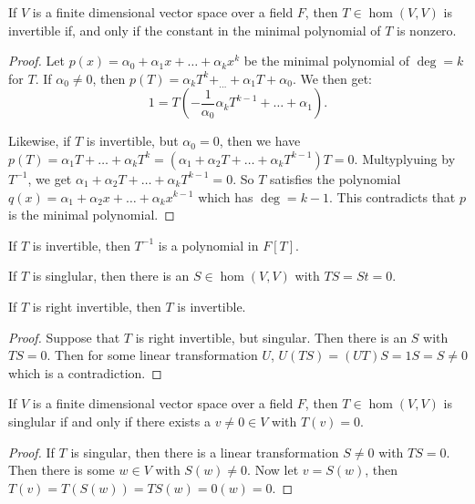 \begin{theorem}\label{3.1.5}
    If $V$ is a finite dimensional vector space over a field  $F$, then  $T \in
    \hom{(V,V)}$ is invertible if, and only if the constant in the minimal
    polynomial of  $T$ is nonzero.
\end{theorem}
\begin{proof}
    Let $p(x)=\alpha_0+\alpha_1x+\dots+\alpha_kx^k$ be the minimal polynomial of
    $\deg = k$ for  $T$. If $\alpha_0 \neq 0$, then
    $p(T)=\alpha_kT^k+_\dots+\alpha_1T+\alpha_0$. We then get:
        \begin{equation*}
            1 = T(-\frac{1}{\alpha_0}\alpha_kT^{k-1}+\dots+\alpha_1).
        \end{equation*}

        Likewise, if $T$ is invertible, but  $\alpha_0 = 0$, then we have
        $p(T)=\alpha_1T+\dots+\alpha_kT^k=(\alpha_1+\alpha_2T+\dots+\alpha_kT^{k-1})T
        =0$. Multyplyuing by $T^{-1}$, we get $\alpha_1+\alpha_2T+\dots+
        \alpha_kT^{k-1}=0$. So $T$ satisfies the polynomial
        $q(x)=\alpha_1+\alpha_2x+\dots+\alpha_kx^{k-1}$ which has $\deg = k-1$.
        This contradicts that  $p$ is the minimal polynomial.
\end{proof}
\begin{corollary}
    If $T$ is invertible, then  $T^{-1}$ is a polynomial in $F[T]$.
\end{corollary}
\begin{corollary}
    If $T$ is singlular, then there is an  $S \in \hom{(V,V)}$ with $TS=St=0$.
\end{corollary}
\begin{corollary}
    If $T$ is right invertible, then  $T$ is invertible.
\end{corollary}
\begin{proof}
    Suppose that $T$ is right invertible, but singular. Then there is an  $S$
    with  $TS=0$. Then for some linear transformation  $U$,  $U(TS)=(UT)S=1S=S
    \neq 0$ which is a contradiction.
\end{proof}

\begin{theorem}\label{3.1.6}
    If $V$ is a finite dimensional vector space over a field  $F$, then  $T \in
    \hom{(V,V)}$ is singlular if and only if there exists a $v \neq 0 \in V$
    with $T(v)=0$. 
\end{theorem}
\begin{proof}
    If $T$ is singular, then there is a linear transformation $S \neq 0$ with
    $TS=0$. Then there is some  $w \in V$ with  $S(w) \neq 0$. Now let $v=S(w)$,
    then $T(v)=T(S(w))=TS(w)=0(w)=0$.
\end{proof}

